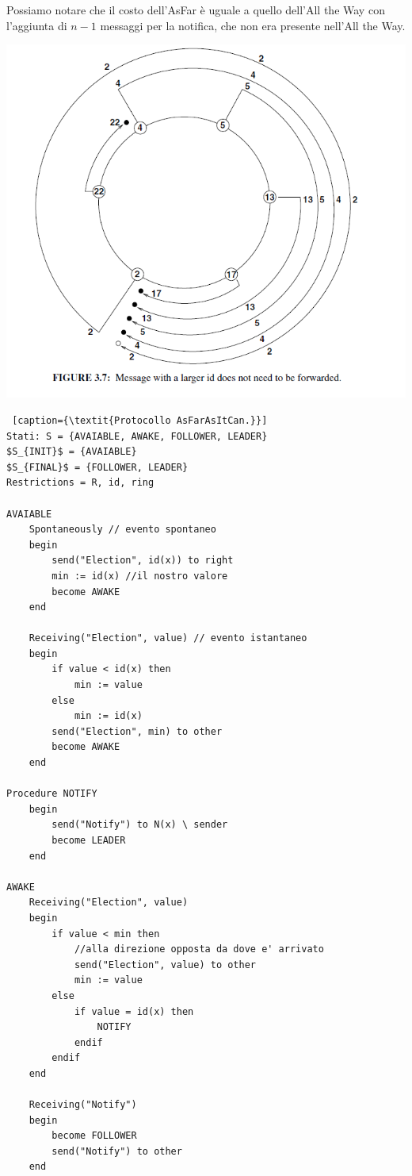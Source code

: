 Possiamo notare che il costo dell'AsFar è uguale a quello dell'All the Way con
l'aggiunta di $n-1$ messaggi per la notifica, che non era presente nell'All the
Way.

\begin{center}
    \includegraphics[scale=0.5]{images/asFar.png}
\end{center}

\newpage
\begin{lstlisting} [caption={\textit{Protocollo AsFarAsItCan.}}]
Stati: S = {AVAIABLE, AWAKE, FOLLOWER, LEADER}
$S_{INIT}$ = {AVAIABLE}
$S_{FINAL}$ = {FOLLOWER, LEADER}
Restrictions = R, id, ring

AVAIABLE
    Spontaneously // evento spontaneo
    begin
        send("Election", id(x)) to right
        min := id(x) //il nostro valore
        become AWAKE
    end
    
    Receiving("Election", value) // evento istantaneo
    begin
        if value < id(x) then
            min := value
        else
            min := id(x)
        send("Election", min) to other
        become AWAKE
    end

Procedure NOTIFY
    begin
        send("Notify") to N(x) \ sender
        become LEADER
    end

AWAKE
    Receiving("Election", value)
    begin
        if value < min then
            //alla direzione opposta da dove e' arrivato
            send("Election", value) to other 
            min := value
        else
            if value = id(x) then 
                NOTIFY
            endif
        endif
    end
    
    Receiving("Notify")
    begin
        become FOLLOWER
        send("Notify") to other
    end
\end{lstlisting}

